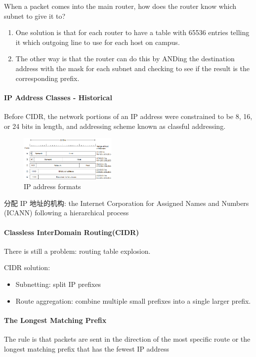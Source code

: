 When a packet comes into the main router, how does the router know which subnet to give it to?
\begin{enumerate}\small
    \item One solution is that for each router to have a table with 65536
    entries telling it which outgoing line to use for each host on
    campus.
    \item The other way is that the router can do this by ANDing the
    destination address with the mask for each subnet and checking
    to see if the result is the corresponding prefix.
\end{enumerate}

\paragraph{IP Address Classes - Historical}Before CIDR, the
network portions of an IP address were constrained to be 8, 16, or 24
bits in length, and addressing scheme known as classful addressing. 

\begin{figure}[!htb]
    \centering
    \includegraphics[width=0.42\textwidth]{pic/CN5/IP address formats}
    \caption{IP address formats}
\end{figure}
分配 IP 地址的机构: the Internet
Corporation for Assigned Names and Numbers (ICANN)
following a hierarchical process

\paragraph{Classless InterDomain Routing(CIDR)} There is still a problem: routing table explosion. 

CIDR solution: 
\begin{itemize}
    \item Subnetting: split IP prefixes
    \item Route aggregation: combine multiple small prefixes into
    a single larger prefix.
\end{itemize}

\paragraph{The Longest Matching Prefix}The rule is that packets are sent in the direction of the most
specific route or the longest matching prefix that has the
fewest IP address

